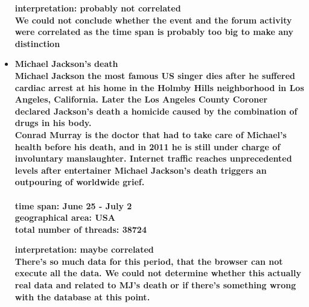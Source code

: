 \documentclass[11pt,a4paper,english]{article}
\begin{document}
\begin{itemize}
\begin{figure}[H]
\begin{center}
							\end{center}
							\vspace{-5pt}
						\end{figure}	
						\bf interpretation: \rm probably not correlated
						\\ We could not conclude whether the event and the forum activity were correlated as the time span is probably too big to make any distinction
						
						
					\item \bf Michael Jackson's death \rm
						\\ Michael Jackson the most famous US singer dies after he suffered cardiac arrest at his home in the Holmby Hills neighborhood in Los Angeles, California. Later the Los Angeles County Coroner declared Jackson's death a homicide caused by the combination of drugs in his body.
						\\ Conrad Murray is the doctor that had to take care of Michael's health before his death, and in 2011 he is still under charge of involuntary manslaughter. Internet traffic reaches unprecedented levels after entertainer Michael Jackson's death triggers an outpouring of worldwide grief.
						\\\\ \bf time span: \rm June 25 - July 2
						\\ \bf geographical area: \rm USA
						\\ \bf total number of threads: \rm 38724
						
						
						\bf interpretation: \rm maybe correlated
						\\There's so much data for this period, that the browser can not execute all the data. We could not determine whether this actually real data and related to MJ's death or if there's something wrong with the database at this point.
						
						
%						
%						
						
					
						
				\end{itemize}
 \newpage	
\end{document}
